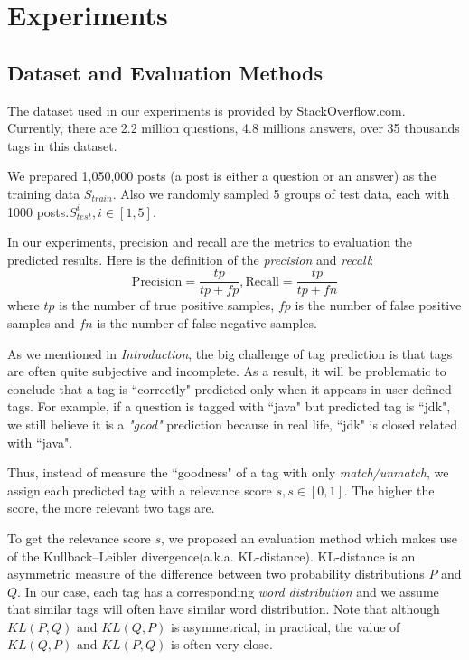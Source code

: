 \section{Experiments}

\subsection{Dataset and Evaluation Methods}
The dataset used in our experiments is provided by StackOverflow.com. Currently, there are 2.2 million questions, 4.8 millions answers, over 35 thousands tags in this dataset\cite{DataDump}.

We prepared 1,050,000 posts (a post is either a question or an answer)  as the training data $S_{train}$. Also we randomly sampled 5 groups of test data, each with 1000 posts.$S_{test}^i, i \in [1, 5]$.

In our experiments, precision and recall are the metrics to evaluation the predicted results. Here is the definition of the \emph{precision} and \emph{recall}:
$$ \text{Precision}=\frac{tp}{tp+fp}, \text{Recall}=\frac{tp}{tp+fn} $$
where $tp$ is the number of true positive samples, $fp$ is the number of false positive samples and $fn$ is the number of false negative samples.

As we mentioned in \emph{Introduction}, the big challenge of tag prediction is that tags are often quite subjective and incomplete. As a result, it will be problematic to conclude that a tag is ``correctly" predicted only when it appears in user-defined tags. For example, if a question is tagged with ``java" but predicted tag is ``jdk", we still believe it is a \emph{"good"} prediction because in real life, ``jdk" is closed related with ``java".

Thus, instead of measure the ``goodness" of a tag with only \emph{match/unmatch}, we assign each predicted tag with a relevance score $s, s \in [0, 1]$. The higher the score, the more
relevant two tags are.

To get the relevance score $s$, we proposed an evaluation method which makes use of the Kullback–Leibler divergence(a.k.a. KL-distance). KL-distance is an asymmetric measure of the difference between two probability distributions $P$ and $Q$. In our case, each tag has a corresponding \emph{word distribution} and we assume that similar tags will often have similar word distribution. Note that although $KL(P, Q)$ and $KL(Q, P)$ is asymmetrical, in practical, the value of
$KL(Q, P)$ and $KL(P, Q)$ is often very close.


